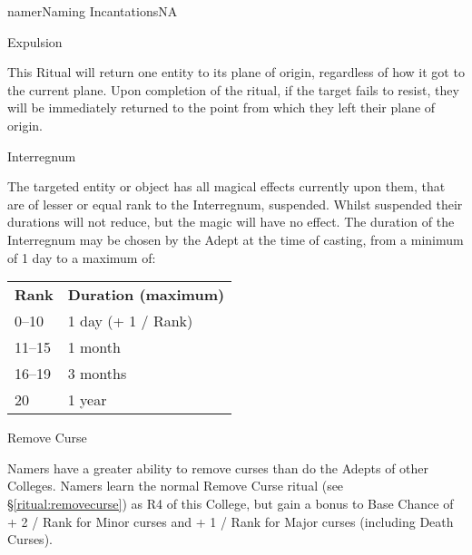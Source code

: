 \begin{college}[2.0]{namer}{Naming Incantations}{NA}
\begin{ritual}[R-2]{Expulsion}

\begin{effects}
This Ritual will return one entity to its plane of origin, regardless
of how it got to the current plane. Upon completion of the ritual, if
the target fails to resist, they will be immediately returned to the
point from which they left their plane of origin.
\end{effects}
\end{ritual}

\begin{ritual}[R-3]{Interregnum}

\begin{effects}
The targeted entity or object has all magical effects currently upon
them, that are of lesser or equal rank to the Interregnum, suspended.
Whilst suspended their durations will not reduce, but the magic will
have no effect. The duration of the Interregnum may be chosen by the
Adept at the time of casting, from a minimum of 1 day to a maximum of:

\begin{inline}
\begin{tabular}{ll}
\textbf{Rank} &
\textbf{Duration (maximum)} \\
0--10		& 1 day (+ 1 / Rank) \\
11--15		& 1 month \\
16--19		& 3 months \\
20		& 1 year \\
\end{tabular}
\end{inline}
\end{effects}
\end{ritual}

\begin{ritual}[R-4]{Remove Curse}
\begin{effects}
Namers have a greater ability to remove curses than do the Adepts of
other Colleges. Namers learn the normal Remove Curse ritual (see
\S\ref{ritual:removecurse}) as R4 of this College, but gain a bonus
to Base Chance of + 2 / Rank for Minor curses and + 1 / Rank for Major
curses (including Death Curses).
\end{effects}
\end{ritual}


\end{college}
